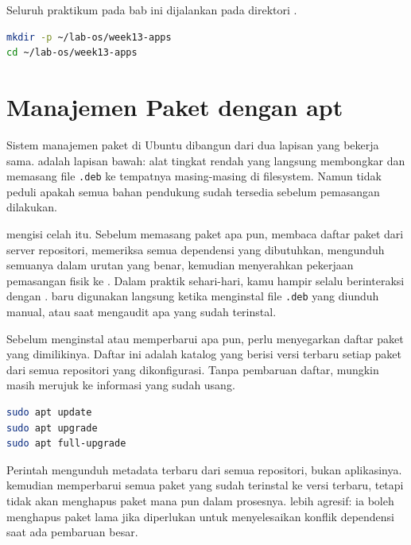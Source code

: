 \begin{notebox}
Seluruh praktikum pada bab ini dijalankan pada direktori .
\begin{lstlisting}[language=bash]
mkdir -p ~/lab-os/week13-apps
cd ~/lab-os/week13-apps
\end{lstlisting}
\end{notebox}

\section{Manajemen Paket dengan apt}
\label{sec:apt-package-management}

Sistem manajemen paket di Ubuntu dibangun dari dua lapisan yang bekerja sama.
 adalah lapisan bawah: alat tingkat rendah yang langsung membongkar
dan memasang file \texttt{.deb} ke tempatnya masing-masing di filesystem. Namun
 tidak peduli apakah semua bahan pendukung sudah tersedia sebelum
pemasangan dilakukan.

 mengisi celah itu. Sebelum memasang paket apa pun, 
membaca daftar paket dari server repositori, memeriksa semua dependensi yang
dibutuhkan, mengunduh semuanya dalam urutan yang benar, kemudian menyerahkan
pekerjaan pemasangan fisik ke . Dalam praktik sehari-hari, kamu
hampir selalu berinteraksi dengan .  baru digunakan
langsung ketika menginstal file \texttt{.deb} yang diunduh manual, atau
saat mengaudit apa yang sudah terinstal.

Sebelum menginstal atau memperbarui apa pun,  perlu menyegarkan
daftar paket yang dimilikinya. Daftar ini adalah katalog yang berisi versi
terbaru setiap paket dari semua repositori yang dikonfigurasi. Tanpa pembaruan
daftar,  mungkin masih merujuk ke informasi yang sudah usang.

\begin{lstlisting}[language=bash, caption={Memperbarui daftar paket dan sistem}]
sudo apt update
sudo apt upgrade
sudo apt full-upgrade
\end{lstlisting}

Perintah  mengunduh metadata terbaru dari semua repositori,
bukan aplikasinya.  kemudian memperbarui semua paket yang
sudah terinstal ke versi terbaru, tetapi tidak akan menghapus paket mana pun
dalam prosesnya.  lebih agresif: ia boleh menghapus
paket lama jika diperlukan untuk menyelesaikan konflik dependensi saat ada
pembaruan besar.

